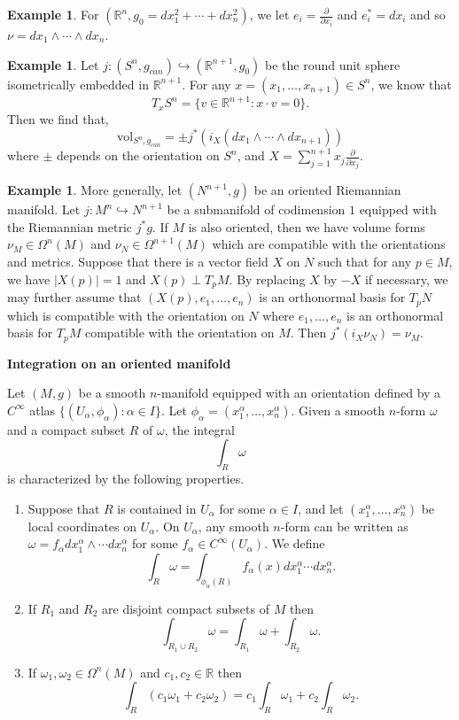 \documentclass{amsart}
\numberwithin{equation}{section}
\newcommand{\bR}{\mathbb{R}}
\theoremstyle{definition}
\newtheorem{example}[definition]{Example}
\theoremstyle{theorem}
\begin{document}
\begin{example}
For $(\bR^n, g_0 = dx_1^2 + \cdots + dx_n^2)$, we let $e_i = \frac{\partial}{\partial x_i}$ and $e_i^* = dx_i$ and so $\nu = dx_1 \wedge \cdots \wedge dx_n$. 
\end{example}

\begin{example}
Let $j : (S^n, g_{can}) \hookrightarrow (\mathbb{R}^{n+1}, g_0)$ be the round unit sphere isometrically embedded in $\mathbb{R}^{n+1}$. For any $x  = (x_1, \ldots, x_{n+1})\in S^n$, we know that 
\[
T_xS^n = \{v \in \mathbb{R}^{n+1} : x \cdot v = 0\}. 
\]
Then we find that,
\[
\text{vol}_{S^n, g_{can}} = \pm j^*(i_X(dx_1 \wedge \cdots \wedge dx_{n+1}))
\]
where $\pm$ depends on the orientation on $S^n$, and
$X = \sum_{j=1}^{n+1} x_j \frac{\partial}{\partial x_j}$.
\end{example}

\begin{example}
More generally, let $(N^{n+1}, g)$ be an oriented Riemannian manifold. Let $j : M^n \hookrightarrow N^{n+1}$ be a submanifold of codimension $1$ equipped with the Riemannian metric $j^*g$. If $M$ is also oriented, then we have volume forms $\nu_M \in \Omega^n(M)$ and $\nu_N \in \Omega^{n+1}(M)$ which are compatible with the orientations and metrics. Suppose that there is a vector field $X$ on $N$ such that for any $p \in M$, we have $|X(p)| = 1$ and $X(p) \perp T_pM$.  By replacing $X$ by $-X$ if necessary, we may 
further assume that $(X(p), e_1, \ldots, e_n)$ is an orthonormal basis for $T_pN$ which is compatible with the orientation on $N$ where $e_1, \ldots, e_n$ is an orthonormal basis for $T_p M$ compatible with the orientation on $M$. Then $j^*(i_X\nu_N) = \nu_M$. 
\end{example}

\noindent
{\bf \large Integration on an oriented manifold}

Let $(M,g)$ be a smooth $n$-manifold equipped with an orientation defined by a $C^\infty$ atlas 
$\{ (U_\alpha,\phi_\alpha): \alpha\in I\}$. Let $\phi_\alpha= (x_1^\alpha,\ldots, x_n^\alpha)$.
Given a smooth $n$-form $\omega$ and a compact subset $R$ of $\omega$, the integral
$$
\int_R \omega
$$
is characterized by the following properties. 

\begin{enumerate}
\item Suppose that $R$ is contained in $U_\alpha$ for some $\alpha\in I$, and let $(x_1^\alpha,\ldots, x_n^\alpha)$
be local coordinates on $U_\alpha$. On $U_\alpha$, any smooth $n$-form can be written
as $\omega = f_\alpha dx_1^\alpha\wedge \cdots dx_n^\alpha$ for some $f_\alpha\in C^\infty(U_\alpha)$. We define
$$
\int_R \omega = \int_{\phi_\alpha(R)} f_\alpha(x)dx_1^\alpha \cdots dx_n^\alpha. 
$$
\item If $R_1$ and $R_2$ are disjoint compact subsets of $M$ then
$$
\int_{R_1\cup R_2}  \omega = \int_{R_1}\omega  + \int_{R_2} \omega.
$$
\item If $\omega_1,\omega_2\in \Omega^n(M)$ and $c_1,c_2\in \bR$ then
$$
\int_R (c_1\omega_1+c_2\omega_2)= c_1 \int_R \omega_1 + c_2\int_R \omega_2. 
$$
\end{enumerate}
\end{document}
